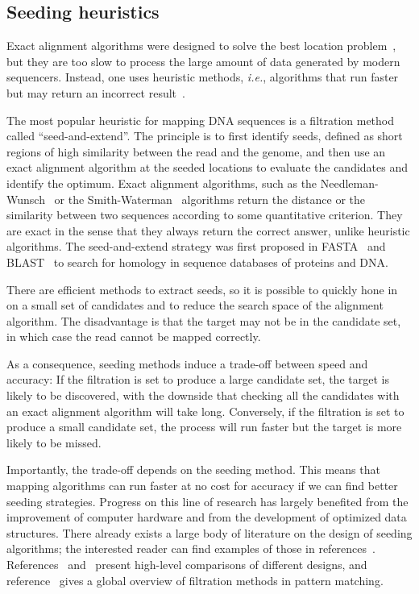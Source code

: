 \documentclass{article}
\begin{document}
\subsection{Seeding heuristics}
\label{sec:seedheur}

Exact alignment algorithms were designed to solve the best location
problem~\cite{pmid5420325, pmid7265238}, but they are too slow to process
the large amount of data generated by modern sequencers. Instead, one uses
heuristic methods, \textit{i.e.}, algorithms that run faster but may
return an incorrect result~\cite{Waterman1984}.

The most popular heuristic for mapping DNA sequences is a filtration
method called ``seed-and-extend''. The principle is to first identify
seeds, defined as short regions of high similarity between the read and
the genome, and then use an exact alignment algorithm at the seeded
locations to evaluate the candidates and identify the optimum. Exact
alignment algorithms, such as the Needleman-Wunsch~\cite{pmid5420325} or
the Smith-Waterman~\cite{pmid7265238} algorithms return the distance or
the similarity between two sequences according to some quantitative
criterion. They are exact in the sense that they always return the correct
answer, unlike heuristic algorithms. The seed-and-extend strategy was
first proposed in FASTA~\cite{pmid2983426} and BLAST~\cite{pmid2231712} to
search for homology in sequence databases of proteins and DNA.

There are efficient methods to extract seeds, so it is possible to quickly
hone in on a small set of candidates and to reduce the search space of the
alignment algorithm. The disadvantage is that the target may not be in the
candidate set, in which case the read cannot be mapped correctly.

As a consequence, seeding methods induce a trade-off between speed and
accuracy: If the filtration is set to produce a large candidate set, the
target is likely to be discovered, with the downside that checking all the
candidates with an exact alignment algorithm will take long. Conversely,
if the filtration is set to produce a small candidate set, the process
will run faster but the target is more likely to be missed.

Importantly, the trade-off depends on the seeding method. This means that
mapping algorithms can run faster at no cost for accuracy if we can find
better seeding strategies. Progress on this line of research has largely
benefited from the improvement of computer hardware and from the
development of optimized data structures. There already exists a large
body of literature on the design of seeding algorithms; the interested
reader can find examples of those in references~\cite{sun2005designing,
pmid11934743, xu2006optimizing, kucherov2005multiseed, brejova2003vector,
pmid18684737, pmid15359419}. References~\cite{pmid16533404}
and~\cite{pmid20460430} present high-level comparisons of different
designs, and reference~\cite{navarro2001guided} gives a global overview of
filtration methods in pattern matching.
\end{document}
